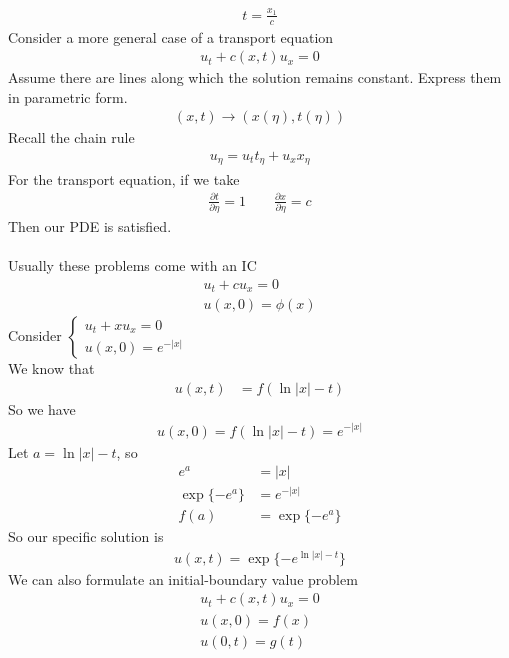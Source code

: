 \documentclass[12pt, letterpaper]{article}
\begin{document}
\begin{align*}
    t = \frac{x_1}{c}
\end{align*}
Consider a more general case of a transport equation
\begin{align*}
    u_t + c(x,t)u_x = 0
\end{align*}
Assume there are lines along which the solution remains constant. Express them in
parametric form.
\begin{align*}
    (x,t) \rightarrow (x(\eta),t(\eta))
\end{align*}
Recall the chain rule
\begin{align*}
    u_\eta = u_t t_\eta + u_x x_\eta
\end{align*}
For the transport equation, if we take 
\begin{align*}
    \frac{\partial t}{\partial \eta} = 1 \qquad \frac{\partial x}{\partial \eta} = c
\end{align*}
Then our PDE is satisfied. \\ \\ 
Usually these problems come with an IC
\begin{align*}
    u_t + c u_x = 0 \\
    u(x,0) = \phi(x)
\end{align*}
 Consider 
$\begin{cases}
    u_t + x u_x = 0 \\
    u(x,0) = e^{-|x|}
\end{cases}$ \\
We know that 
\begin{align*}
    u(x,t) &= f(\ln|x| - t)
\end{align*}
So we have 
\begin{align*}
    u(x,0) = f(\ln|x| - t) = e^{-|x|}
\end{align*}
Let $a = \ln|x| - t$, so 
\begin{align*}
    e^a &= |x| \\
    \exp\{-e^a\} &= e^{-|x|} \\
    f(a) &= \exp\{-e^a\}
\end{align*}
So our specific solution is 
\begin{align*}
    u(x,t) = \exp\{-e^{\ln|x|-t}\}
\end{align*}
We can also formulate an initial-boundary value problem
\begin{align*}
    u_t + c(x,t) u_x = 0 \\
    u(x,0) = f(x) \\
    u(0,t) = g(t)
\end{align*}
\end{document}
